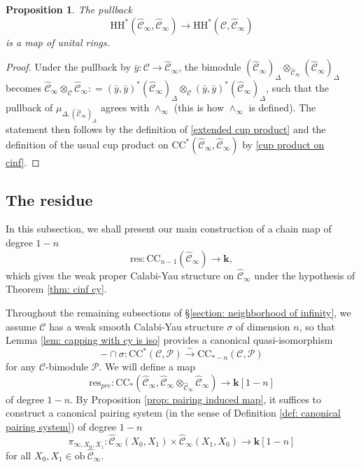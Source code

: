 \documentclass[11pt]{amsproc}
\def\K{{\mathbf{k}}}
\def\cP{\mathcal{P}}
\def\cc{\mathcal{C}}
\def\r#1{\mathrm{#1}}
\def\D{\Delta}
\def\ob{\mathrm{ob\ }}
\def\cinf{\widehat{\cc}_{\infty}}
\newtheorem{prop}[lem]{Proposition}
\theoremstyle{remark}
\numberwithin{equation}{section}
\begin{document}
\begin{prop}
The pullback 
\begin{equation}
\r{HH}^{*}(\cinf, \cinf) \to \r{HH}^{*}(\cc, \cinf)
\end{equation}
is a map of unital rings.
\end{prop}
\begin{proof}
Under the pullback by $\bar{y}: \cc \to \cinf$, 
the bimodule $(\cinf)_{\D} \otimes_{\cinf} (\cinf)_{\D}$ becomes $\cinf \otimes_{\cc} \cinf: = (\bar{y}, \bar{y})^{*}(\cinf)_{\D} \otimes_{\cc} (\bar{y}, \bar{y})^{*}(\cinf)_{\D}$,
such that the pullback of $\mu_{\D, (\cinf)_{\D}}$ agrees with $\wedge_{\infty}$ (this is how $\wedge_{\infty}$ is defined).
The statement then follows by the definition of \eqref{extended cup product} and the definition of the usual cup product on $\r{CC}^{*}(\cinf, \cinf)$ by \eqref{cup product on cinf}.
\end{proof}


\subsection{The residue}\label{section:res}

In this subsection, we shall present our main construction of a chain map of degree $1-n$
\begin{equation}\label{res cy}
\r{res}: \r{CC}_{n-1}(\cinf) \to \K,
\end{equation}
which gives the weak proper Calabi-Yau structure on $\cinf$ under the hypothesis of Theorem \ref{thm: cinf cy}.

Throughout the remaining subsections of \S\ref{section: neighborhood of infinity},
we assume $\cc$ has a weak smooth Calabi-Yau structure $\sigma$ of dimension $n$,
so that Lemma \ref{lem: capping with cy is iso} provides a canonical quasi-isomorphism
\[
-\cap \sigma: \r{CC}^{*}(\cc, \cP) \stackrel{\sim}\to \r{CC}_{*-n}(\cc, \cP)
\]
for any $\cc$-bimodule $\cP$.
We will define a map 
\begin{equation}\label{res with tensor product coefficients}
\r{res}_{pre}: \r{CC}_{*}(\cinf, \cinf \otimes_{\cinf} \cinf) \to \K[1-n]
\end{equation}
of degree $1-n$.
By Proposition \ref{prop: pairing induced map}, it suffices to construct a canonical pairing system (in the sense of Definition \ref{def: canonical pairing system}) of degree $1-n$
\begin{equation}\label{pairing on cinf}
\pi_{\infty, X_{0}, X_{1}}: \cinf(X_{0}, X_{1}) \times \cinf(X_{1}, X_{0}) \to \K[1-n]
\end{equation}
for all $X_{0}, X_{1} \in \ob \cinf$.
\end{document}
